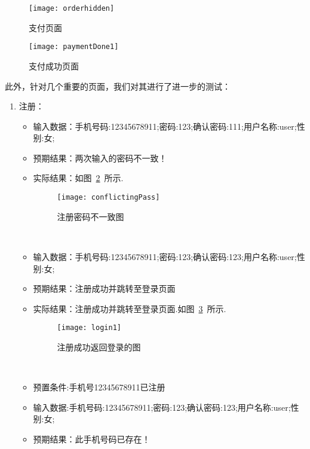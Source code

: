 \begin{figure}[htbp]
    \centering
    \begin{minipage}{0.4\textwidth}
        \centering
        \texttt{[image: orderhidden]}
        \caption{支付页面}\label{fig:orderhidden1}
    \end{minipage}
    \begin{minipage}{0.4\textwidth}
        \centering
        \texttt{[image: paymentDone1]}
        \caption{支付成功页面}\label{fig:paymentDone1}
    \end{minipage}
\end{figure}
此外，针对几个重要的页面，我们对其进行了进一步的测试：
\begin{enumerate}
    \item{注册}：
    \begin{itemize}
        \item{输入数据}：手机号码:12345678911;密码:123;确认密码:111;用户名称:user;性别:女;
        \item {预期结果}：两次输入的密码不一致！
        \item {实际结果}：如图~\ref{fig:conflictingPass}~所示.
              \begin{figure}[htbp]
                  \centering
                  \texttt{[image: conflictingPass]}
                  \caption{注册密码不一致图}\label{fig:conflictingPass}
              \end{figure}
              ~\\
              \item{输入数据}：手机号码:12345678911;密码:123;确认密码:123;用户名称:user;性别:女;
        \item {预期结果}：注册成功并跳转至登录页面
        \item {实际结果}：注册成功并跳转至登录页面.如图~\ref{fig:login1}~所示.
              \begin{figure}[htbp]
                  \centering
                  \texttt{[image: login1]}
                  \caption{注册成功返回登录的图}\label{fig:login1}
              \end{figure}
              ~\\
              \item{预置条件}:手机号12345678911已注册
              \item{输入数据}:手机号码:12345678911;密码:123;确认密码:123;用户名称:user;性别:女;
        \item {预期结果}：此手机号码已存在！

\end{itemize}
\end{enumerate}
